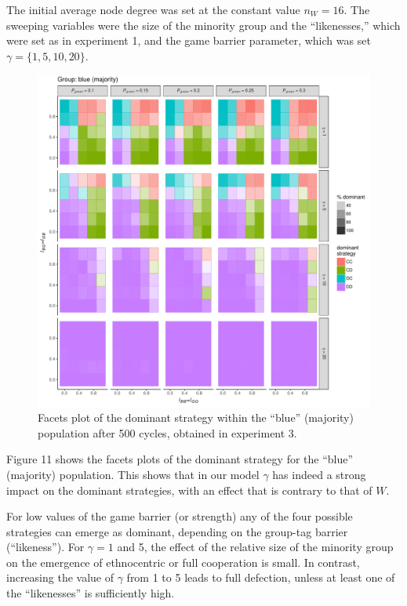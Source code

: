 The initial average node degree was set at the constant value $ n_W = 16 $. The sweeping variables were the size of the minority group and the ``likenesses,'' which were set as in experiment 1, and the game barrier parameter, which was set $ \gamma = \{1,5,10,20\} $. 
\begin{figure}[ht!]
	\label{fig:strategyHostExperiment3}
	\begin{minipage}[c]{0.2\linewidth}
		\caption{Facets plot of the dominant strategy within the ``blue'' (majority) population after 500 cycles, obtained in experiment 3.}
	\end{minipage}
	\begin{minipage}[c]{0.75\linewidth}
		\includegraphics[trim={0cm 0cm 0.4cm 0cm}, clip, width=\linewidth]{figures/strategyHostExperiment3.pdf}
	\end{minipage}
\end{figure}

Figure 11 shows the facets plots of the dominant strategy for the ``blue'' (majority) population. This shows that in our model $ \gamma $ has indeed a strong impact on the dominant strategies, with an effect that is contrary to that of $ W $.

For low values of the game barrier (or strength)  any of the four possible strategies can emerge as dominant, depending on the group-tag barrier (``likeness''). For $ \gamma = 1 $ and 5, the effect of the relative size of the minority group on the emergence of ethnocentric or full cooperation is small. In contrast, increasing the value of $ \gamma $ from 1 to 5 leads to full defection, unless at least one of the ``likenesses'' is sufficiently high.

